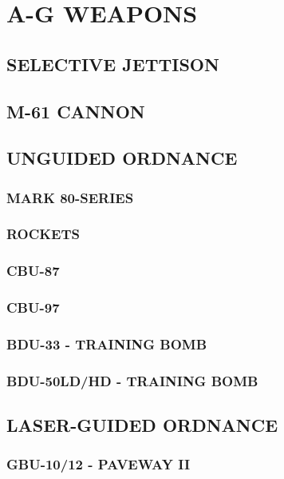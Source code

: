 \chapter{A-G WEAPONS}
\minitoc
\cleardoublepage

\section{SELECTIVE JETTISON}

\clearpage

\section{M-61 CANNON}

\clearpage 

\section{UNGUIDED ORDNANCE}

\subsection{MARK 80-SERIES}
\subsection{ROCKETS}
\subsection{CBU-87}
\subsection{CBU-97}
\subsection{BDU-33 - TRAINING BOMB}
\subsection{BDU-50LD/HD - TRAINING BOMB}

\clearpage 

\section{LASER-GUIDED ORDNANCE}

\subsection{GBU-10/12 - PAVEWAY II}
